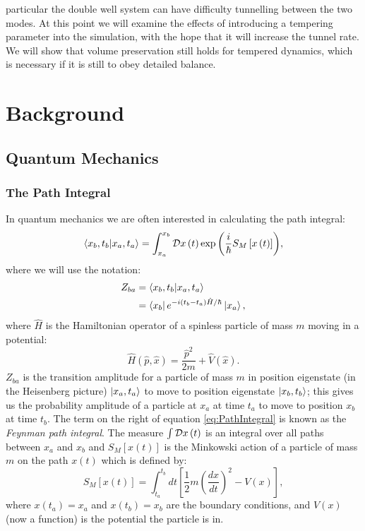 \documentclass[12pt]{article}
\begin{document}
particular the double well system can have difficulty tunnelling between the two modes. At this point we will examine the effects of introducing a tempering parameter into the simulation, with the hope that it will increase the tunnel rate. We will show that volume preservation still holds for tempered dynamics, which is necessary if it is still to obey detailed balance.


\section{Background}
    \subsection{Quantum Mechanics}
        \subsubsection{The Path Integral}
        \label{sec:QuantumMechanics}
        In quantum mechanics we are often interested in calculating the path integral:
        \begin{equation}
            \label{eq:PathIntegral}
            \braket{x_b,t_b|x_a,t_a} = \int_{x_a}^{x_b} {\cal D} x\left(t\right) \exp{\left(\frac{i}{\hbar} S_M\left[x\left(t\right)\right]\right)},
        \end{equation}
        where we will use the notation:
        \begin{align}
            \label{eq:PathIntegralZ_fi}
            Z_{ba} & = \braket{x_b,t_b|x_a,t_a} \\
            \label{eq:PathIntegralZ_fi2}
                   & = \bra{x_b}e^{-i\left(t_b-t_a\right)\hat{H}/\hbar}\ket{x_a},
        \end{align}
        where $\hat{H}$ is the Hamiltonian operator of a spinless particle of mass $m$ moving in a potential:
        \begin{equation}
            \hat{H}\left(\hat{p},\hat{x}\right) = \frac{\hat{p}^2}{2m} + \hat{V}\left(\hat{x}\right).
        \end{equation} 
        $Z_{ba}$ is the transition amplitude for a particle of mass $m$ in position eigenstate (in the Heisenberg picture) $\ket{x_a,t_a}$ to move to position eigenstate $\ket{x_b,t_b}$; this gives us the probability amplitude of a particle at $x_a$ at time $t_a$ to move to position $x_b$ at time $t_b$. The term on the right of equation \ref{eq:PathIntegral} is known as the \textit{Feynman path integral}. The measure $\int {\cal D} x\left(t\right)$ is an integral over all paths between $x_a$ and $x_b$ and $S_M\left[x\left(t\right)\right]$ is the Minkowski action of a particle of mass $m$ on the path $x\left(t\right)$ which is defined by:
        \begin{equation}
            \label{eq:MinkowskiAction}
            S_M\left[x\left(t\right)\right] = \int_{t_a}^{t_b} dt \left[\frac{1}{2}m\left(\frac{dx}{dt}\right)^2 - V(x)\right],
        \end{equation}
        where $x\left(t_a\right) = x_a$ and $x\left(t_b\right) = x_b$ are the boundary conditions, and $V\left(x\right)$ (now a function) is the potential the particle is in.
\end{document}
